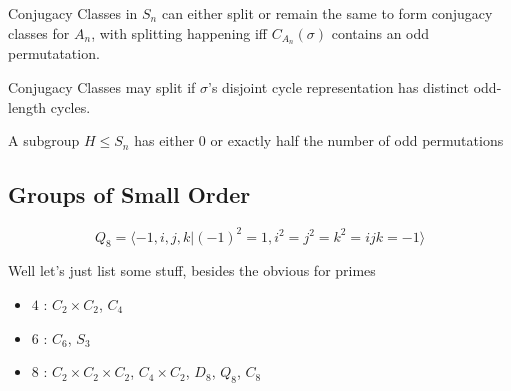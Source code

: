 \documentclass[11pt]{scrartcl}
\begin{document}
\begin{prop}
Conjugacy Classes in $S_n$ can either split or remain the same to form conjugacy classes for $A_n$, with splitting happening iff $C_{A_n}(\sigma)$ contains an odd permutatation.
\end{prop}
\begin{definitions}
Conjugacy Classes may split if $\sigma$'s disjoint cycle representation has distinct odd-length cycles.
\end{definitions}
\begin{definitions}
A subgroup $H \leq S_n$ has either 0 or exactly half the number of odd permutations
\end{definitions}

\subsection{Groups of Small Order}
\begin{definitions}
$$Q_8 = \langle -1,i,j,k \vert (-1)^2=1, i^2=j^2=k^2=ijk=-1\rangle$$
\end{definitions}
\begin{prop}
Well let's just list some stuff, besides the obvious for primes
\begin{itemize}
    \item $4$ : $C_2 \times C_2 $, $C_4$
    \item $6$ : $C_6$, $S_3$
    \item $8$ : $C_2 \times C_2 \times C_2$, $C_4 \times C_2$, $D_8$, $Q_8$, $C_8$
\end{itemize}
\end{prop}
\end{document}
